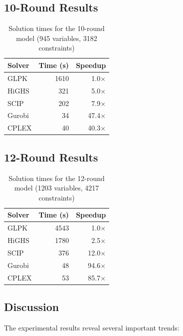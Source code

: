 \documentclass[11pt,a4paper]{article}
\begin{document}
\subsection{10-Round Results}

\begin{table}[ht]
  \centering
  \caption{Solution times for the 10-round model (945 variables, 3182 constraints)}
  \label{tab:10round}
  \begin{tabular}{lrr}
    \toprule
    Solver  & Time (s) & Speedup \\
    \midrule
    GLPK   & 1610 & 1.0$\times$ \\
    HiGHS  & 321  & 5.0$\times$ \\
    SCIP   & 202  & 7.9$\times$ \\
    Gurobi & 34   & 47.4$\times$ \\
    CPLEX  & 40   & 40.3$\times$ \\
    \bottomrule
  \end{tabular}
\end{table}

\subsection{12-Round Results}

\begin{table}[ht]
  \centering
  \caption{Solution times for the 12-round model (1203 variables, 4217 constraints)}
  \label{tab:12round}
  \begin{tabular}{lrr}
    \toprule
    Solver  & Time (s) & Speedup \\
    \midrule
    GLPK   & 4543 & 1.0$\times$ \\
    HiGHS  & 1780 & 2.5$\times$ \\
    SCIP   & 376  & 12.0$\times$ \\
    Gurobi & 48   & 94.6$\times$ \\
    CPLEX  & 53   & 85.7$\times$ \\
    \bottomrule
  \end{tabular}
\end{table}

\subsection{Discussion}

The experimental results reveal several important trends:
\end{document}
